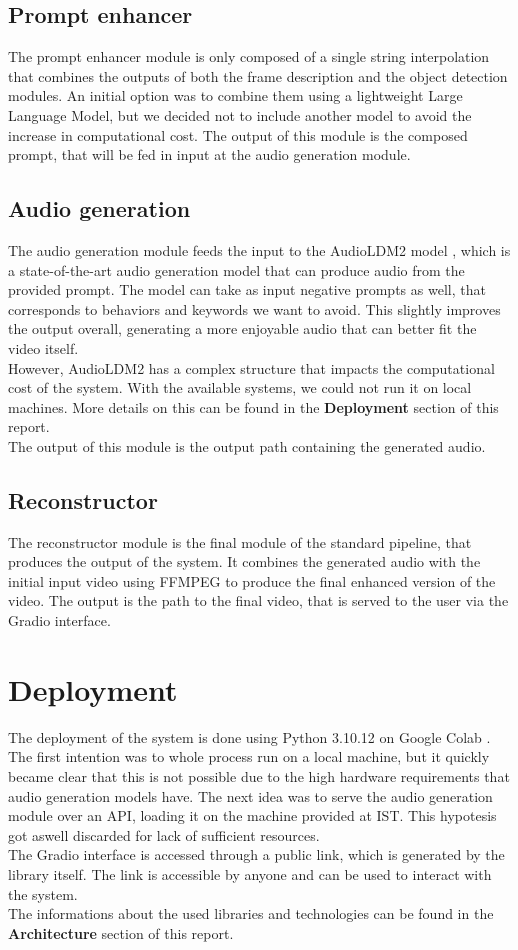 \documentclass[conference]{IEEEtran}
\begin{document}
\subsection{Prompt enhancer}
The prompt enhancer module is only composed of a single string interpolation that combines the outputs of both the frame description and the object detection modules. An initial option was to combine them using a lightweight Large Language Model, but we decided not to include another model to avoid the increase in computational cost.
The output of this module is the composed prompt, that will be fed in input at the audio generation module. 

\subsection{Audio generation}
The audio generation module feeds the input to the AudioLDM2 model \cite{audioldm2}, which is a state-of-the-art audio generation model that can produce audio from the provided prompt. The model can take as input negative prompts as well, that corresponds to behaviors and keywords we want to avoid. 
This slightly improves the output overall, generating a more enjoyable audio that can better fit the video itself.\\
However, AudioLDM2 has a complex structure that impacts the computational cost of the system. With the available systems, we could not run it on local machines. More details on this can be found in the \textbf{Deployment} section of this report.\\
The output of this module is the output path containing the generated audio.

\subsection{Reconstructor}
The reconstructor module is the final module of the standard pipeline, that produces the output of the system.
It combines the generated audio with the initial input video using FFMPEG \cite{ffmpeg} to produce the final enhanced version of the video. 
The output is the path to the final video, that is served to the user via the Gradio interface.

\section{Deployment}
The deployment of the system is done using Python 3.10.12 on Google Colab \cite{Colab}. The first intention was to whole process run on a local machine, but it quickly became clear that this is not possible due to the high hardware requirements that audio generation models have.
The next idea was to serve the audio generation module over an API, loading it on the machine provided at IST. This hypotesis got aswell discarded for lack of sufficient resources.
\\The Gradio interface is accessed through a public link, which is generated by the library itself. The link is accessible by anyone and can be used to interact with the system.
\\The informations about the used libraries and technologies can be found in the \textbf{Architecture} section of this report.
\end{document}
